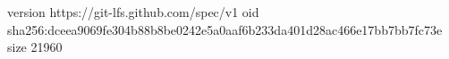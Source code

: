 version https://git-lfs.github.com/spec/v1
oid sha256:dceea9069fe304b88b8be0242e5a0aaf6b233da401d28ac466e17bb7bb7fc73e
size 21960
